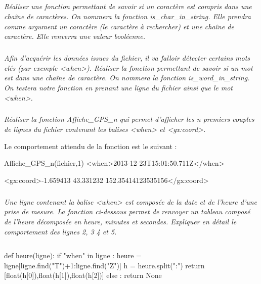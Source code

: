 \documentclass[10pt,oneside]{article}
\begin{document}
\subparagraph{}
\textit{Réaliser une fonction permettant de savoir si un caractère est compris dans une chaîne de caractères. On nommera la fonction \textsf{is\_char\_in\_string}. Elle prendra comme argument un caractère (le caractère à rechercher) et une chaîne de caractère. Elle renverra une valeur booléenne.}


\subparagraph{}
\textit{Afin d'acquérir les données issues du fichier, il va falloir détecter certains mots clés (par exemple \textsf{<when>}). Réaliser la fonction permettant de savoir si  un mot est dans une chaîne de caractère. On nommera la fonction \textsf{is\_word\_in\_string}. On testera notre fonction en prenant une ligne du fichier ainsi que le mot \textsf{<when>}.}


\subparagraph{}
\textit{Réaliser la fonction \textsf{Affiche\_GPS\_n} qui permet d'afficher les n premiers couples de lignes du fichier contenant les balises \textsf{<when>} et \textsf{<gx:coord>}.}
\begin{exemple}
Le comportement attendu de la fonction est le suivant :
\begin{py}
\begin{python}
Affiche_GPS_n(fichier,1)
    <when>2013-12-23T15:01:50.711Z</when>
    
    <gx:coord>-1.659413 43.331232 152.35414123535156</gx:coord>
    
\end{python}
\end{py}
\end{exemple}


\subparagraph{}
\textit{Une ligne contenant la balise \textsf{<when>} est composée de la date et de l'heure d'une prise de mesure. La fonction ci-dessous permet de renvoyer un tableau composé de l'heure décomposée en heure, minutes et secondes. Expliquer en détail le comportement des lignes 2, 3 4 et 5.}

\begin{py}
\begin{minipage}[c]{.1\linewidth}
$$ $$
\end{minipage}\hfill
\begin{minipage}[c]{.8\linewidth}
\begin{python_nb}
def heure(ligne):
    if "when" in ligne :
        heure = ligne[ligne.find("T")+1:ligne.find("Z")]
        h = heure.split(":")
        return [float(h[0]),float(h[1]),float(h[2])]
    else :
        return None
\end{python_nb}
\end{minipage}
\end{py}
\end{document}

